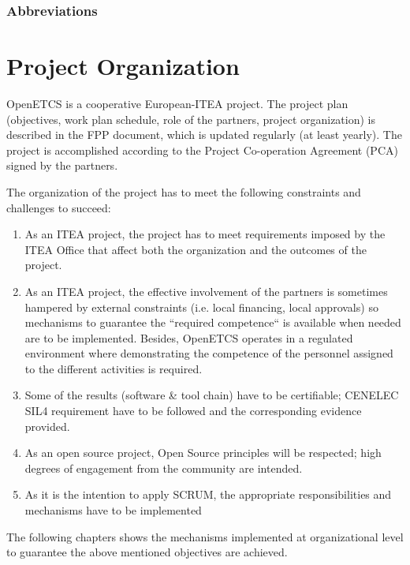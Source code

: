 \documentclass{template/openetcs_article}
\begin{document}
\printglossary[title=]


\subsubsection{Abbreviations}
\printglossary[type=\acronymtype,title=]


\newpage
\section{Project Organization}

OpenETCS is a cooperative European-ITEA project. The project plan (objectives, work plan schedule, role of the partners, project organization) is described in the \citep{fpp} FPP document, which is updated regularly (at least yearly). The project is accomplished according to the Project Co-operation Agreement (PCA) \citep{PCA} signed by the partners.

The organization of the project has to meet the following constraints and challenges to succeed:

\begin{enumerate}
\item As an ITEA project, the project has to meet requirements imposed by the ITEA Office that affect both the organization and the outcomes of the project.
\item As an ITEA project, the effective involvement of the partners is sometimes hampered by external constraints (i.e. local financing, local approvals) so mechanisms to guarantee the “required competence“ is available when needed are to be implemented. Besides, OpenETCS operates in a regulated environment where demonstrating the competence of the personnel assigned to the different activities is required. 
\item Some of the results (software \& tool chain) have to be certifiable; CENELEC SIL4 requirement \citep{subset026} have to be followed and the corresponding evidence provided. 
\item As an open source project, Open Source principles will be respected; high degrees of engagement from the community are intended.
\item As it is the intention to apply SCRUM, the appropriate responsibilities and mechanisms have to be implemented
\end{enumerate}

The following chapters shows the mechanisms implemented at organizational level to guarantee the above mentioned objectives are achieved.
\end{document}
